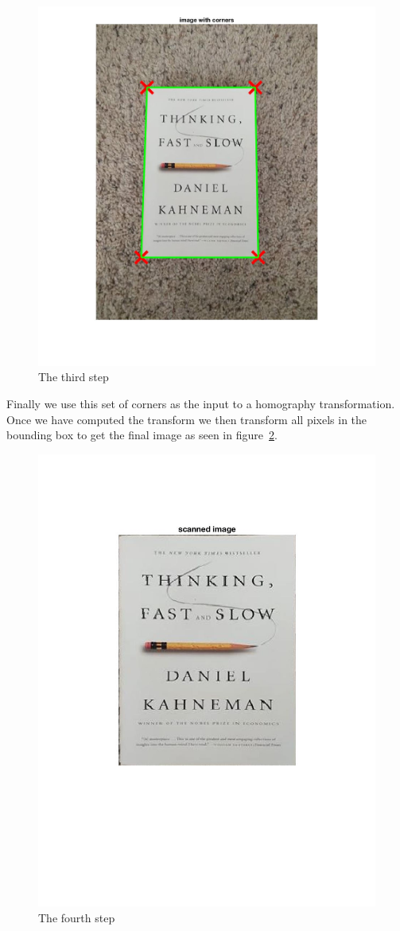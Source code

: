 \begin{figure}[t]
\begin{center}
   \includegraphics[width=0.8\linewidth]{figures/step3.jpg}
\end{center}
\caption{The third step}
\label{fig:box}
\end{figure}

Finally we use this set of corners as the input to a homography transformation.
Once we have computed the transform we then transform all pixels in the bounding box to get the final image as seen in figure~\ref{fig:final}.


\begin{figure}[t]
\begin{center}
   \includegraphics[width=0.8\linewidth]{figures/step4.jpg}
\end{center}
\caption{The fourth step}
\label{fig:final}
\end{figure}
